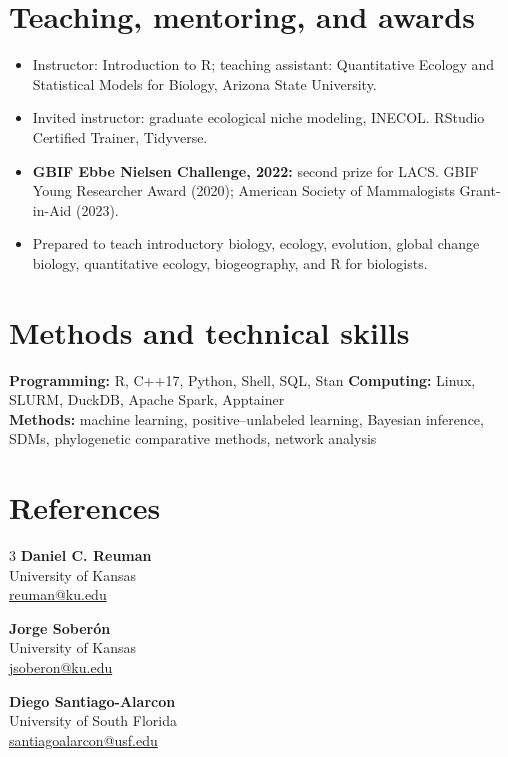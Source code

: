 \documentclass[10pt,letterpaper]{article}
\begin{document}
\section*{Teaching, mentoring, and awards}
\begin{itemize}
\item Instructor: Introduction to R; teaching assistant: Quantitative Ecology and Statistical Models for Biology, Arizona State University.
\item Invited instructor: graduate ecological niche modeling, INECOL. RStudio Certified Trainer, Tidyverse.
\item \textbf{GBIF Ebbe Nielsen Challenge, 2022:} second prize for LACS. GBIF Young Researcher Award (2020); American Society of Mammalogists Grant-in-Aid (2023).
\item Prepared to teach introductory biology, ecology, evolution, global change biology, quantitative ecology, biogeography, and R for biologists.
\end{itemize}

\section*{Methods and technical skills}
\textbf{Programming:} R, C++17, Python, Shell, SQL, Stan \quad
\textbf{Computing:} Linux, SLURM, DuckDB, Apache Spark, Apptainer\\
\textbf{Methods:} machine learning, positive--unlabeled learning, Bayesian inference, SDMs, phylogenetic comparative methods, network analysis

\section*{References}
\begin{multicols}{3}
\textbf{Daniel C. Reuman}\\
University of Kansas\\
\href{mailto:reuman@ku.edu}{reuman@ku.edu}

\columnbreak
\textbf{Jorge Soberón}\\
University of Kansas\\
\href{mailto:jsoberon@ku.edu}{jsoberon@ku.edu}

\columnbreak
\textbf{Diego Santiago-Alarcon}\\
University of South Florida\\
\href{mailto:santiagoalarcon@usf.edu}{santiagoalarcon@usf.edu}
\end{multicols}
\end{document}

